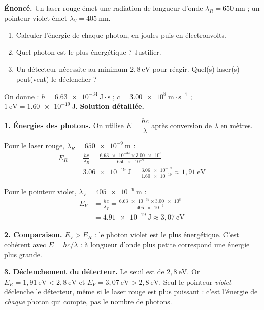 \documentclass[11pt]{article}
\begin{document}
\begin{exoresolu}
\textbf{Énoncé.} Un laser rouge émet une radiation de longueur d'onde $\lambda_R = 650~\text{nm}$ ; un pointeur violet émet $\lambda_V = 405~\text{nm}$.
\begin{enumerate}
\item Calculer l'énergie de chaque photon, en joules puis en électronvolts.
\item Quel photon est le plus énergétique ? Justifier.
\item Un détecteur nécessite au minimum $2{,}8~\text{eV}$ pour réagir. Quel(s) laser(s) peut(vent) le déclencher ?
\end{enumerate}
On donne : $h = \num{6,63e-34}~\text{J}\cdot\text{s}$ ; $c = \num{3,00e8}~\text{m}\cdot\text{s}^{-1}$ ; $1~\text{eV} = \num{1,60e-19}~\text{J}$.
\tcblower
\textbf{Solution détaillée.}

\textbf{1. Énergies des photons.} On utilise $E = \dfrac{hc}{\lambda}$ après conversion de $\lambda$ en mètres.

Pour le laser rouge, $\lambda_R = \num{650e-9}~\text{m}$ :
\begin{align*}
E_R &= \frac{hc}{\lambda_R} = \frac{\num{6,63e-34} \times \num{3,00e8}}{\num{650e-9}} \\
&= \num{3,06e-19}~\text{J} = \frac{\num{3,06e-19}}{\num{1,60e-19}} \approx 1{,}91~\text{eV}
\end{align*}

Pour le pointeur violet, $\lambda_V = \num{405e-9}~\text{m}$ :
\begin{align*}
E_V &= \frac{hc}{\lambda_V} = \frac{\num{6,63e-34} \times \num{3,00e8}}{\num{405e-9}} \\
&= \num{4,91e-19}~\text{J} \approx 3{,}07~\text{eV}
\end{align*}

\textbf{2. Comparaison.} $E_V > E_R$ : le photon violet est le plus énergétique. C'est cohérent avec $E = hc/\lambda$ : à longueur d'onde plus petite correspond une énergie plus grande.

\textbf{3. Déclenchement du détecteur.} Le seuil est de $2{,}8~\text{eV}$. Or $E_R = 1{,}91~\text{eV} < 2{,}8~\text{eV}$ et $E_V = 3{,}07~\text{eV} > 2{,}8~\text{eV}$. Seul le pointeur \emph{violet} déclenche le détecteur, même si le laser rouge est plus puissant : c'est l'énergie de \emph{chaque} photon qui compte, pas le nombre de photons.
\end{exoresolu}
\end{document}
